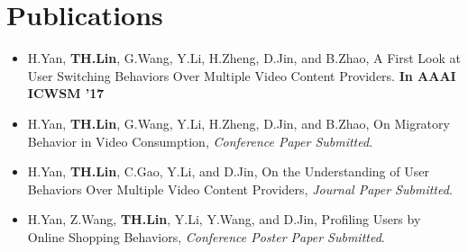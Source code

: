 \documentclass[letterpaper,11pt]{article}
\makeatletter
\newcommand{\resumeSubheadinghonor}[3]{
  \vspace{-1pt}\item
    \begin{tabular*}{0.97\textwidth}{l@{\extracolsep{\fill}}r}
      \textbf{#1} {#2}\\
      ~~\textit{\small#3}\\
    \end{tabular*}\vspace{-5pt}
}
\newcommand{\sectionwithbox}[1]{
  \section{\colorbox[rgb]{0.8,0.8,0.8}{{#1}}}
}
\newcommand{\resumeSubheadingPublication}[1]{
  \vspace{-1pt}\item
      {#1}
    \vspace{-5pt}
}
\newcommand{\resumeSubHeadingListStart}{\begin{itemize}[leftmargin=*]}
\newcommand{\resumeSubHeadingListEnd}{\end{itemize}}
\makeatother
\begin{document}
    



\sectionwithbox{Publications}
  \resumeSubHeadingListStart
  	\resumeSubheadingPublication{H.Yan, \large\textbf{TH.Lin}\normalsize, G.Wang, Y.Li, H.Zheng, D.Jin, and B.Zhao, A First Look at User Switching Behaviors Over Multiple Video Content Providers. \textbf{In AAAI ICWSM '17}}
	\resumeSubheadingPublication{H.Yan, \large\textbf{TH.Lin}\normalsize, G.Wang, Y.Li, H.Zheng, D.Jin, and B.Zhao, On Migratory Behavior in Video Consumption, \emph{Conference Paper Submitted}.}
	\resumeSubheadingPublication{H.Yan, \large\textbf{TH.Lin}\normalsize, C.Gao, Y.Li, and D.Jin, On the Understanding of User Behaviors Over Multiple Video Content Providers, \emph{Journal Paper Submitted}.}
	\resumeSubheadingPublication{H.Yan, Z.Wang, \large\textbf{TH.Lin}\normalsize, Y.Li, Y.Wang, and D.Jin, Profiling Users by Online Shopping Behaviors, \emph{Conference Poster Paper Submitted}.}
  \resumeSubHeadingListEnd
  
  
\end{document}
